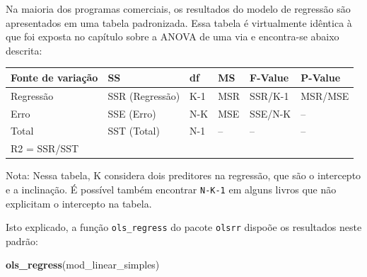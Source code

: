 \documentclass[
]{book}
\newenvironment{Shaded}{\begin{snugshade}}{\end{snugshade}}
\newcommand{\KeywordTok}[1]{\textcolor[rgb]{0.13,0.29,0.53}{\textbf{#1}}}
\newcommand{\NormalTok}[1]{#1}
\begin{document}
Na maioria dos programas comerciais, os resultados do modelo de regressão são apresentados em uma tabela padronizada. Essa tabela é virtualmente idêntica à que foi exposta no capítulo sobre a ANOVA de uma via e encontra-se abaixo descrita:

\begin{longtable}[]{@{}llllll@{}}
\toprule
Fonte de variação & SS & df & MS & F-Value & P-Value\tabularnewline
\midrule
\endhead
Regressão & SSR (Regressão) & K-1 & MSR & SSR/K-1 & MSR/MSE\tabularnewline
Erro & SSE (Erro) & N-K & MSE & SSE/N-K & --\tabularnewline
Total & SST (Total) & N-1 & -- & -- & --\tabularnewline
R2 = SSR/SST & & & & &\tabularnewline
\bottomrule
\end{longtable}

Nota: Nessa tabela, K considera dois preditores na regressão, que são o intercepto e a inclinação. É possível também encontrar \texttt{N-K-1} em alguns livros que não explicitam o intercepto na tabela.

Isto explicado, a função \texttt{ols\_regress} do pacote \texttt{olsrr} dispoõe os resultados neste padrão:

\begin{Shaded}
\begin{Highlighting}[]
\KeywordTok{ols_regress}\NormalTok{(mod_linear_simples) }
\end{Highlighting}
\end{Shaded}
\end{document}
